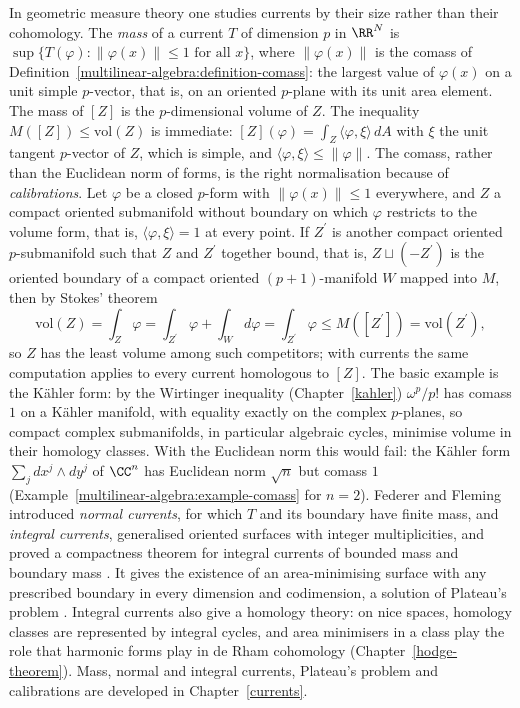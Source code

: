 \begin{remark}\label{currents:remark-gmt-currents}
In geometric measure theory one studies currents by their size rather than their cohomology. The \emph{mass} of a current $T$ of dimension $p$ in $\RR^N$ is
$\sup\{T(\varphi) : \|\varphi(x)\| \leq 1 \text{ for all } x\}$, where $\|\varphi(x)\|$ is the comass of Definition~\ref{multilinear-algebra:definition-comass}: the largest value of $\varphi(x)$ on a unit simple $p$-vector, that
is, on an oriented $p$-plane with its unit area element. The mass of $[Z]$ is the $p$-dimensional volume of $Z$. The inequality $M([Z]) \leq \mathrm{vol}(Z)$ is immediate: $[Z](\varphi) = \int_Z\langle\varphi, \xi\rangle\,dA$ with
$\xi$ the unit tangent $p$-vector of $Z$, which is simple, and $\langle\varphi, \xi\rangle \leq \|\varphi\|$. The comass, rather than the Euclidean norm of forms, is the right normalisation because of
\emph{calibrations}. Let $\varphi$ be a closed $p$-form with $\|\varphi(x)\| \leq 1$ everywhere, and $Z$ a compact oriented submanifold without boundary on which $\varphi$ restricts to the volume form, that is,
$\langle\varphi, \xi\rangle = 1$ at every point. If $Z^{\prime}$ is another compact oriented $p$-submanifold such that $Z$ and $Z^{\prime}$ together bound, that is, $Z \sqcup (-Z^{\prime})$ is the oriented boundary of a compact oriented
$(p + 1)$-manifold $W$ mapped into $M$, then by Stokes' theorem
\[
\mathrm{vol}(Z) = \int_Z\varphi = \int_{Z^{\prime}}\varphi + \int_Wd\varphi = \int_{Z^{\prime}}\varphi \leq M([Z^{\prime}]) = \mathrm{vol}(Z^{\prime}),
\]
so $Z$ has the least volume among such competitors; with currents the same computation applies to every current homologous to $[Z]$. The basic example is the K\"ahler form: by the Wirtinger inequality (Chapter~\ref{kahler}) $\omega^p/p!$ has comass $1$ on a K\"ahler manifold, with
equality exactly on the complex $p$-planes, so compact complex submanifolds, in particular algebraic cycles, minimise volume in their homology classes. With the Euclidean norm this would fail: the K\"ahler form
$\sum_jdx^j \wedge dy^j$ of $\CC^n$ has Euclidean norm $\sqrt n$ but comass $1$ (Example~\ref{multilinear-algebra:example-comass} for $n = 2$). Federer and Fleming introduced \emph{normal currents}, for which $T$ and its
boundary have finite mass, and \emph{integral currents}, generalised oriented surfaces with integer multiplicities, and proved a compactness theorem for integral currents of bounded mass and
boundary mass \cite{federer-fleming-1960}. It gives the existence of an area-minimising surface with any prescribed boundary in every dimension and codimension, a solution of Plateau's problem
\cite{federer-gmt}. Integral currents also give a homology theory: on nice spaces, homology classes are represented by integral cycles, and area minimisers in a class play the role that harmonic
forms play in de Rham cohomology (Chapter~\ref{hodge-theorem}). Mass, normal and integral currents, Plateau's problem and calibrations are developed in Chapter~\ref{currents}.
\end{remark}

